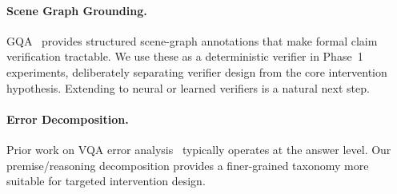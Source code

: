 \paragraph{Scene Graph Grounding.}
GQA~\cite{hudson2019gqa} provides structured scene-graph annotations that make formal
claim verification tractable. We use these as a deterministic verifier in Phase~1
experiments, deliberately separating verifier design from the core intervention
hypothesis. Extending \bci{} to neural or learned verifiers is a natural next step.

\paragraph{Error Decomposition.}
Prior work on VQA error analysis~\cite{antol2015vqa,goyal2017making} typically operates
at the answer level. Our premise/reasoning decomposition provides a finer-grained
taxonomy more suitable for targeted intervention design.
